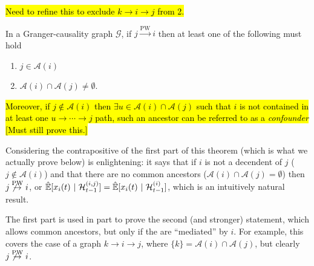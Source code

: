 \documentclass[12pt]{article}
\def\pwgc{\overset{\text{PW}}{\rightarrow}}  %
\def\gcg{\mathcal{G}}  %
\def\H{\mathcal{H}}  %
\newcommand{\linE}[2]{\hat{\E}[#1\ |\ #2]}  %
\newcommand{\anc}[1]{\mathcal{A}(#1)}  %
\begin{document}
\begin{proposition}
  \label{prop:ancestor_properties}
\hl{Need to refine this to exclude $k \rightarrow i \rightarrow j$ from 2.}

  In a Granger-causality graph $\gcg$, if $j \pwgc i$ then at least
  one of the following must hold

  \begin{enumerate}
    \item{$j \in \anc{i}$}
    \item{$\anc{i} \cap \anc{j} \ne \emptyset$.}
  \end{enumerate}

  \hl{Moreover, if $j \not\in \anc{i}$ then $\exists u \in \anc{i} \cap \anc{j}$ such that $i$ is not contained in at least one $u \rightarrow \cdots \rightarrow j$ path, such an ancestor can be referred to as a \textit{confounder} [Must still prove this.]}
\end{proposition}

\begin{remark}
  Considering the contrapositive of the first part of this theorem (which is what we actually prove below) is enlightening: it says that if $i$ is not a decendent of $j$ ($j \not \in \anc{i}$) and that there are no common ancestors ($\anc{i} \cap \anc{j} = \emptyset$) then $j \not \pwgc i$, or $\linE{x_i(t)}{\H_{t - 1}^{(i, j)}} = \linE{x_i(t)}{\H_{t - 1}^{(i)}}$, which is an intuitively natural result.

  The first part is used in part to prove the second (and stronger) statement, which allows common ancestors, but only if the are ``mediated'' by $i$.  For example, this covers the case of a graph $k \rightarrow i \rightarrow j$, where $\{k\} = \anc{i} \cap \anc{j}$, but clearly $j \not \pwgc i$.
\end{remark}
\end{document}
